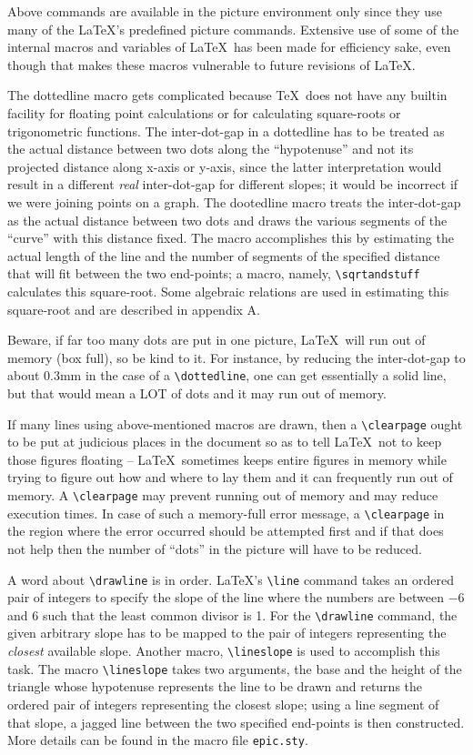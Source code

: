 Above commands are available in the picture environment only since they use
many of the \LaTeX 's predefined picture commands. Extensive use of some of
the internal macros and variables of \LaTeX\ has been made for efficiency
sake, even though that makes these macros vulnerable to future revisions of
\LaTeX.

The dottedline macro gets complicated because \TeX\ does not have any builtin
facility for floating point calculations or for calculating square-roots or
trigonometric functions. The inter-dot-gap in a dottedline has to be treated
as the actual distance between two dots along the ``hypotenuse'' and not its
projected distance along x-axis or y-axis, since the latter interpretation
would result in a different {\it real\/} inter-dot-gap for different slopes;
it would be incorrect if we were joining points on a graph. The dootedline
macro treats the inter-dot-gap as the actual distance between two dots and
draws the various segments of the ``curve'' with this distance fixed. The
macro accomplishes this by estimating the actual length of the line and the
number of segments of the specified distance that will fit between the two
end-points; a macro, namely, \verb|\sqrtandstuff| calculates this
square-root. Some algebraic relations are used in estimating this square-root
and are described in appendix A.

Beware, if far too many dots are put in one picture, \LaTeX\ will run out of
memory (box full), so be kind to it. For instance, by reducing the
inter-dot-gap to about 0.3mm in the case of a \verb|\dottedline|, one can get
essentially a solid line, but that would mean a LOT of dots and it may run
out of memory.

If many lines using above-mentioned macros are drawn, then a
\verb|\clearpage| ought to be put at judicious places in the document so as
to tell \LaTeX\ not to keep those figures floating -- \LaTeX\ sometimes
keeps entire figures in memory while trying to figure out how and where to
lay them and it can frequently run out of memory. A \verb|\clearpage| may
prevent running out of memory and may reduce execution times.
In case of such a
memory-full error message, a \verb|\clearpage| in the region where the error
occurred should be attempted first and if that does not help then the number
of ``dots'' in the picture will have to be reduced.

A word about \verb|\drawline| is in order. \LaTeX 's \verb|\line| command
takes an ordered pair of integers to specify the slope of the line where the
numbers are between $-$6 and 6 such that the least common divisor is 1. For
the \verb|\drawline| command, the given arbitrary slope has to be mapped to
the pair of integers representing the {\it closest\/} available slope.
Another macro, \verb|\lineslope| is used to accomplish this task. The macro
\verb|\lineslope| takes two arguments, the base and the height of the
triangle whose hypotenuse represents the line to be drawn and returns the
ordered pair of integers representing the closest slope; using a line segment
of that slope, a jagged line between the two specified end-points is then
constructed. More details can be found in the macro file {\tt epic.sty}.

